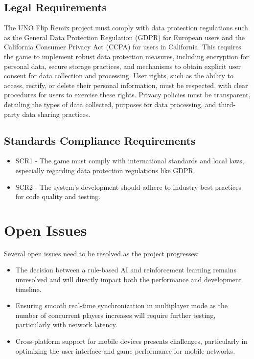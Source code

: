 \documentclass{article}
\begin{document}
\subsection{Legal Requirements}
The UNO Flip Remix project must comply with data protection regulations such as the General Data Protection Regulation (GDPR) for European users and the California Consumer Privacy Act (CCPA) for users in California. This requires the game to implement robust data protection measures, including encryption for personal data, secure storage practices, and mechanisms to obtain explicit user consent for data collection and processing. User rights, such as the ability to access, rectify, or delete their personal information, must be respected, with clear procedures for users to exercise these rights. Privacy policies must be transparent, detailing the types of data collected, purposes for data processing, and third-party data sharing practices.

\subsection{Standards Compliance Requirements}
\begin{itemize}
    \item SCR1 - The game must comply with international standards and local laws, especially regarding data protection regulations like GDPR.
    \item SCR2 - The system’s development should adhere to industry best practices for code quality and testing.
\end{itemize}

\section{Open Issues}
Several open issues need to be resolved as the project progresses:
\begin{itemize}
    \item The decision between a rule-based AI and reinforcement learning remains unresolved and will directly impact both the performance and development timeline.
    \item Ensuring smooth real-time synchronization in multiplayer mode as the number of concurrent players increases will require further testing, particularly with network latency.
    \item Cross-platform support for mobile devices presents challenges, particularly in optimizing the user interface and game performance for mobile networks.
\end{itemize}
\end{document}
